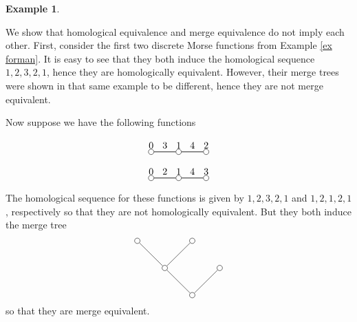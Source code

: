 \documentclass{article}
\theoremstyle{definition}
\newtheorem{ex}[thm]    {Example}
\begin{document}
\begin{ex}\label{ex hom}

We show that homological equivalence and merge equivalence do not imply each other.  First, consider the first two discrete Morse functions from Example \ref{ex forman}.  It is easy to see that they both induce the homological sequence $1,2,3,2,1$, hence they are homologically equivalent.  However, their merge trees were shown in that same example to be different, hence they are not merge equivalent.




Now suppose we have the following functions

$$
\begin{tikzpicture}
\node[inner sep=2pt, circle] (0) at (-1,0) [draw] {};
\node[inner sep=2pt, circle] (1) at (0,0) [draw] {};
\node[inner sep=2pt, circle] (2) at (1,0) [draw] {};

\path[style=semithick] (0) edge node[anchor=south]{{$3$}}(1);
\path[style=semithick] (1) edge node[anchor=south]{{$4$}}(2);

\node[anchor = south]  at (0) {{$0$}};
\node[anchor = south]  at (1) {{$1$}};
\node[anchor = south]  at (2) {{$2$}};
\end{tikzpicture}
$$

$$
\begin{tikzpicture}
\node[inner sep=2pt, circle] (0) at (-1,0) [draw] {};
\node[inner sep=2pt, circle] (1) at (0,0) [draw] {};
\node[inner sep=2pt, circle] (2) at (1,0) [draw] {};

\path[style=semithick] (0) edge node[anchor=south]{{$2$}}(1);
\path[style=semithick] (1) edge node[anchor=south]{{$4$}}(2);

\node[anchor = south]  at (0) {{$0$}};
\node[anchor = south]  at (1) {{$1$}};
\node[anchor = south]  at (2) {{$3$}};
\end{tikzpicture}
$$


The homological sequence for these functions is given by $1,2,3,2,1$ and $1,2,1,2,1$, respectively so that they are not homologically equivalent. But they both induce the merge tree
$$
\begin{tikzpicture}


\node[inner sep=2pt, circle] (0) at (0,2) [draw] {};
\node[inner sep=2pt, circle] (1) at (2,2) [draw] {};
\node[inner sep=2pt, circle] (2) at (3,1) [draw] {};
\node[inner sep=2pt, circle] (3) at (1,1) [draw] {};
\node[inner sep=2pt, circle] (4) at (2,0) [draw] {};

\draw[-]  (0)--(3) node[midway, below] {};
\draw[-]  (3)--(1) node[midway, below] {};
\draw[-]  (3)--(4) node[midway, below] {};
\draw[-]  (2)--(4) node[midway, below] {};

\end{tikzpicture}
$$
so that they are merge equivalent.
\end{ex}
\end{document}
